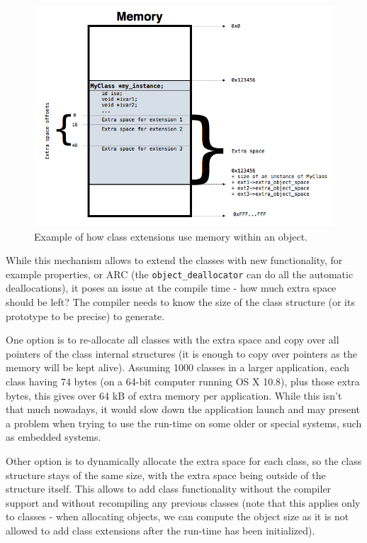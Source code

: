 \begin{figure}[htbp] 
  
  \includegraphics[width=\textwidth]{img/class_extensions.png}
  
  \centering{}
  \caption{Example of how class extensions use memory within an object.}
  \label{fig:class_ext_mem_usage_img}
\end{figure}

While this mechanism allows to extend the classes with new functionality, for example properties, or ARC (the \verb=object_deallocator= can do all the automatic deallocations), it poses an issue at the compile time - how much extra space should be left? The compiler needs to know the size of the class structure (or its prototype to be precise) to generate.

One option is to re-allocate all classes with the extra space and copy over all pointers of the class internal structures (it is enough to copy over pointers as the memory will be kept alive). Assuming 1000 classes in a larger application, each class having 74 bytes (on a 64-bit computer running OS X 10.8), plus those extra bytes, this gives over 64 kB of extra memory per application. While this isn't that much nowadays, it would slow down the application launch and may present a problem when trying to use the run-time on some older or special systems, such as embedded systems.

Other option is to dynamically allocate the extra space for each class, so the class structure stays of the same size, with the extra space being outside of the structure itself. This allows to add class functionality without the compiler support and without recompiling any previous classes (note that this applies only to classes - when allocating objects, we can compute the object size as it is not allowed to add class extensions after the run-time has been initialized).

